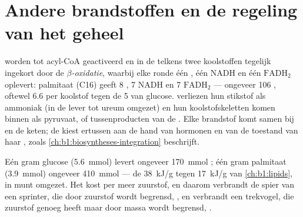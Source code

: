 \section{Andere brandstoffen en de regeling van het geheel}

\begin{proposition}\label{prop:b1:respiration-fermentation:otherfuels}
 worden tot acyl-CoA geactiveerd en in de  telkens
twee koolstoffen tegelijk ingekort door de \emph{$\beta$-oxidatie}, waarbij elke
ronde één , één NADH en één $\mathrm{FADH_2}$ oplevert: palmitaat (C16)
geeft 8 , 7 NADH en 7 $\mathrm{FADH_2}$ --- ongeveer 106 , oftewel
\qty{6.6}{}  per koolstof tegen de 5 van glucose.  verliezen hun
stikstof als ammoniak (in de lever tot ureum omgezet) en hun koolstofskeletten
komen binnen als pyruvaat,  of tussenproducten van de . Elke
brandstof komt samen bij  en de keten; de  kiest ertussen aan de hand
van hormonen en van de toestand van haar , zoals
\cref{ch:b1:biosyntheses-integration} beschrijft.
\end{proposition}

\begin{example}\label{ex:b1:respiration-fermentation:gramofeach}
Eén gram glucose (\qty{5.6}{mmol}) levert ongeveer \qty{170}{mmol} ; één gram
palmitaat (\qty{3.9}{mmol}) ongeveer \qty{410}{mmol} --- de \qty{38}{kJ/g} tegen
\qty{17}{kJ/g} van \cref{ch:b1:lipids}, in munt omgezet. Het  kost per  meer
zuurstof, en daarom verbrandt de spier van een sprinter, die door zuurstof wordt
begrensd, , en verbrandt een trekvogel, die zuurstof genoeg heeft maar
door massa wordt begrensd, .
\end{example}

